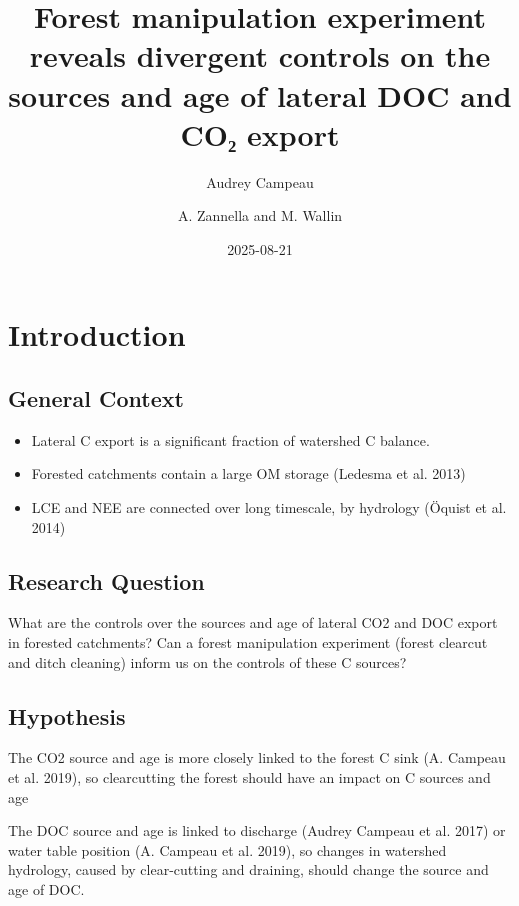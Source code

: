 \documentclass[
  letterpaper,
  DIV=11,
  numbers=noendperiod]{scrartcl}
\title{Forest manipulation experiment reveals divergent controls on the
sources and age of lateral DOC and CO₂ export}
\author{Audrey Campeau \and A. Zannella and M. Wallin}
\date{2025-08-21}
\renewcommand*\contentsname{Table of contents}
\newcommand\contentsname{Table of contents}
\begin{document}
\maketitle

\renewcommand*\contentsname{Table of contents}
{
\hypersetup{linkcolor=}
\setcounter{tocdepth}{2}
\tableofcontents
}

\section{Introduction}\label{introduction}

\subsection{General Context}\label{general-context}

\begin{itemize}
\item
  Lateral C export is a significant fraction of watershed C balance.
\item
  Forested catchments contain a large OM storage (Ledesma et al. 2013)
\item
  LCE and NEE are connected over long timescale, by hydrology (Öquist et
  al. 2014)
\end{itemize}

\subsection{Research Question}\label{research-question}

What are the controls over the sources and age of lateral CO2 and DOC
export in forested catchments? Can a forest manipulation experiment
(forest clearcut and ditch cleaning) inform us on the controls of these
C sources?

\subsection{Hypothesis}\label{hypothesis}

The CO2 source and age is more closely linked to the forest C sink (A.
Campeau et al. 2019), so clearcutting the forest should have an impact
on C sources and age

The DOC source and age is linked to discharge (Audrey Campeau et al.
2017) or water table position (A. Campeau et al. 2019), so changes in
watershed hydrology, caused by clear-cutting and draining, should change
the source and age of DOC.
\end{document}

